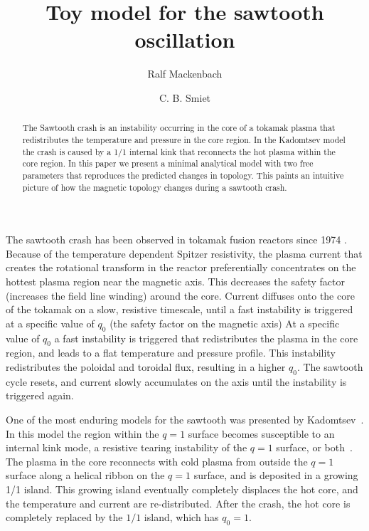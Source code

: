 \documentclass[%
superscriptaddress,
amsmath,amssymb,
aps,
pre,
floatfix,
]{revtex4-2}
\begin{document}
\title{Toy model for the sawtooth oscillation}
\author{Ralf Mackenbach}
\author{C. B. Smiet}

\begin{abstract}
  The Sawtooth crash is an instability occurring in the core of a tokamak plasma that redistributes the temperature and pressure in the core region.
  In the Kadomtsev model the crash is caused by a 1/1 internal kink that reconnects the hot plasma within the core region.
  In this paper we present a minimal analytical model with two free parameters that reproduces the predicted changes in topology.
  This paints an intuitive picture of how the magnetic topology changes during a sawtooth crash.
\end{abstract}
\maketitle

The sawtooth crash has been observed in tokamak fusion reactors since 1974 \cite{von1974studies, vershkov1974role}.
Because of the temperature dependent Spitzer resistivity, the plasma current that creates the rotational transform in the reactor preferentially concentrates on the hottest plasma region near the magnetic axis.
This decreases the safety factor (increases the field line winding) around the core.
Current diffuses onto the core of the tokamak on a slow, resistive timescale, until a fast instability is triggered at a specific value of $q_0$ (the safety factor on the magnetic axis)
At a specific value of $q_0$ a fast instability is triggered that redistributes the plasma in the core region, and leads to a flat temperature and pressure profile.
This instability redistributes the poloidal and toroidal flux, resulting in a higher $q_0$.
The sawtooth cycle resets, and current slowly accumulates on the axis until the instability is triggered again.

One of the most enduring models for the sawtooth was presented by Kadomtsev~\cite{kadomtsev1975disruptive}.
In this model the region within the $q=1$ surface becomes susceptible to an internal kink mode, a resistive tearing instability of the $q=1$ surface, or both~\cite{coppi1976resistive}.
The plasma in the core reconnects with cold plasma from outside the $q=1$ surface along a helical ribbon on the $q=1$ surface, and is deposited in a growing 1/1 island.
This growing island eventually completely displaces the hot core, and the temperature and current are re-distributed.
After the crash, the hot core is completely replaced by the $1/1$ island, which has $q_0=1$.
\end{document}
